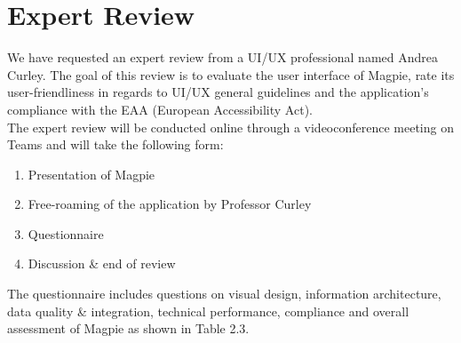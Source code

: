 \documentclass{report}
\begin{document}
\section{Expert Review}
We have requested an expert review from a UI/UX professional named Andrea Curley. The goal of this review is to evaluate the user interface of Magpie, rate its user-friendliness in regards to UI/UX general guidelines and the application's compliance with the EAA (European Accessibility Act).\\
The expert review will be conducted online through a videoconference meeting on Teams and will take the following form:
\begin{enumerate}
    \item Presentation of Magpie
    \item Free-roaming of the application by Professor Curley
    \item Questionnaire
    \item Discussion \& end of review
\end{enumerate}
The questionnaire includes questions on visual design, information architecture, data quality \& integration, technical performance, compliance and overall assessment of Magpie as shown in Table 2.3.
\end{document}

